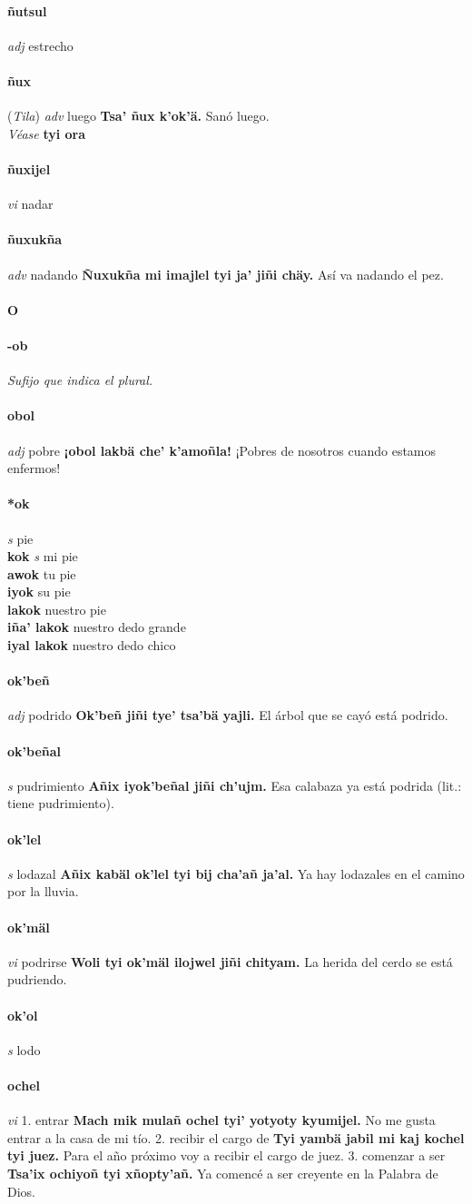 \documentclass{scrbook}
\newcommand{\entry}[1]{\paragraph{#1}}
\newcommand{\alphaletter}[1]{\addsec{#1}}
\newcommand{\onedefinition}[1]{#1.}
\newcommand{\nontranslationdef}[1]{\textit{#1}}
\newcommand{\partofspeech}[1]{\textit{#1}}
\newcommand{\spanishtranslation}[1]{#1}
\newcommand{\cholexample}[1]{\textbf{#1}}
\newcommand{\exampletranslation}[1]{#1}
\newcommand{\alsosee}[1]{\\\textit{Véase} \textbf{#1}}
\newcommand{\relevantdialect}[1]{(\textit{#1})}
\newcommand{\secondaryentry}[1]{\\\textbf{#1}}
\newcommand{\secondpartofspeech}[1]{\textit{#1}}
\newcommand{\secondtranslation}[1]{#1}
\begin{document}
\begin{multicols}{2}
\entry{ñutsul}
\partofspeech{adj}
\spanishtranslation{estrecho}

\entry{ñux}
\relevantdialect{Tila}
\partofspeech{adv}
\spanishtranslation{luego}
\cholexample{Tsa' ñux k'ok'ä.}
\exampletranslation{Sanó luego.}
\alsosee{tyi ora}

\entry{ñuxijel}
\partofspeech{vi}
\spanishtranslation{nadar}

\entry{ñuxukña}
\partofspeech{adv}
\spanishtranslation{nadando}
\cholexample{Ñuxukña mi imajlel tyi ja' jiñi chäy.}
\exampletranslation{Así va nadando el pez.}

\entry{O}
\alphaletter{O}

\entry{-ob}
\nontranslationdef{Sufijo que indica el plural.}

\entry{obol}
\partofspeech{adj}
\spanishtranslation{pobre}
\cholexample{¡obol lakbä che' k'amoñla!}
\exampletranslation{¡Pobres de nosotros cuando estamos enfermos!}

\entry{*ok}
\partofspeech{s}
\spanishtranslation{pie}
\secondaryentry{kok}
\secondpartofspeech{s}
\secondtranslation{mi pie}
\secondaryentry{awok}
\secondtranslation{tu pie}
\secondaryentry{iyok}
\secondtranslation{su pie}
\secondaryentry{lakok}
\secondtranslation{nuestro pie}
\secondaryentry{iña' lakok}
\secondtranslation{nuestro dedo grande}
\secondaryentry{iyal lakok}
\secondtranslation{nuestro dedo chico}

\entry{ok'beñ}
\partofspeech{adj}
\spanishtranslation{podrido}
\cholexample{Ok'beñ jiñi tye' tsa'bä yajli.}
\exampletranslation{El árbol que se cayó está podrido.}

\entry{ok'beñal}
\partofspeech{s}
\spanishtranslation{pudrimiento}
\cholexample{Añix iyok'beñal jiñi ch'ujm.}
\exampletranslation{Esa calabaza ya está podrida (lit.: tiene pudrimiento).}

\entry{ok'lel}
\partofspeech{s}
\spanishtranslation{lodazal}
\cholexample{Añix kabäl ok'lel tyi bij cha'añ ja'al.}
\exampletranslation{Ya hay lodazales en el camino por la lluvia.}

\entry{ok'mäl}
\partofspeech{vi}
\spanishtranslation{podrirse}
\cholexample{Woli tyi ok'mäl ilojwel jiñi chityam.}
\exampletranslation{La herida del cerdo se está pudriendo.}

\entry{ok'ol}
\partofspeech{s}
\spanishtranslation{lodo}

\entry{ochel}
\partofspeech{vi}
\onedefinition{1}
\spanishtranslation{entrar}
\cholexample{Mach mik mulañ ochel tyi' yotyoty kyumijel.}
\exampletranslation{No me gusta entrar a la casa de mi tío.}
\onedefinition{2}
\spanishtranslation{recibir el cargo de}
\cholexample{Tyi yambä jabil mi kaj kochel tyi juez.}
\exampletranslation{Para el año próximo voy a recibir el cargo de juez.}
\onedefinition{3}
\spanishtranslation{comenzar a ser}
\cholexample{Tsa'ix ochiyoñ tyi xñopty'añ.}
\exampletranslation{Ya comencé a ser creyente en la Palabra de Dios.}


\end{multicols}
\end{document}

